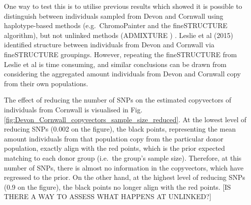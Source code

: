 One way to test this is to utilise previous results which showed it is possible to distinguish between individuals sampled from Devon and Cornwall using haplotype-based methods (e.g.\ ChromoPainter and the fineSTRUCTURE algorithm), but not unlinked methods (ADMIXTURE \cite{alexander2009fast}) \cite{Leslie2015}. Leslie et al (2015) identified structure between individuals from Devon and Cornwall via fineSTRUCTURE groupings. However, repeating the fineSTRUCTURE from Leslie et al is time consuming, and similar conclusions can be drawn from considering the aggregated amount individuals from Devon and Cornwall copy from their own populations.

The effect of reducing the number of SNPs on the estimated copyvectors of individuals from Cornwall is visualised in Fig. \ref{fig:Devon_Cornwall_copyvectors_sample_size_reduced}. At the lowest level of reducing SNPs (0.002 on the figure), the black points, representing the mean amount individuals from that population copy from the particular donor population, exactly align with the red points, which is the prior expected matching to each donor group (i.e.\ the group's sample size). Therefore, at this number of SNPs, there is almost no information in the copyvectors, which have regressed to the prior. On the other hand, at the highest level of reducing SNPs (0.9 on the figure), the black points no longer align with the red points. {\color{red}[IS THERE A WAY TO ASSESS WHAT HAPPENS AT UNLINKED?]}


